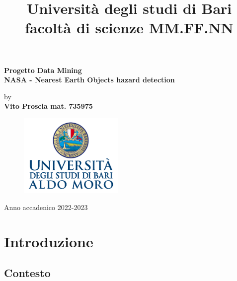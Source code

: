 \documentclass[italian,12pt,a4paper]{article}
\title{Università degli studi di Bari facoltà di scienze MM.FF.NN}
\date{} %
\begin{document}
	\maketitle
	\thispagestyle{empty}
	\begin{center}
		\huge	\textbf{Progetto Data Mining} \\
		\Large \textbf{NASA - Nearest Earth Objects hazard detection}
	\end{center}
	
	
	
	\begin{center}
		by \\
		\Large \textbf{Vito Proscia mat. 735975}
	\end{center}

	
	\begin{figure}[hb]
		\centering
		\includegraphics[width=5cm]{image.png}
	\end{figure}
	
	\vfill
	\begin{center}
		Anno accadenico 2022-2023
	\end{center}
	
	\newpage
	
	\tableofcontents

	\newpage

	
	\section{Introduzione}

	\subsection{Contesto}
\end{document}

